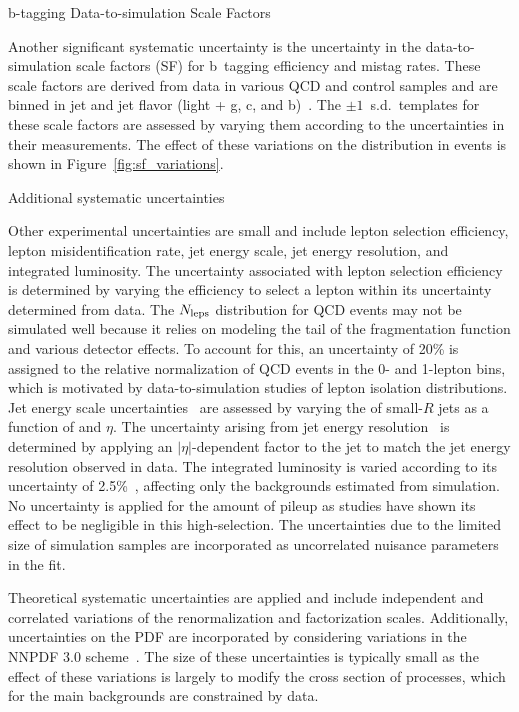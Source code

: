 \begin{section}{b-tagging Data-to-simulation Scale Factors}

Another significant systematic uncertainty is the uncertainty in the data-to-simulation scale factors (SF) for b~tagging efficiency and mistag rates.
These scale factors are derived from data in various QCD and \ttbar control samples and are binned in jet \pT and jet flavor (light + g, c, and b)~\cite{CMS-DP-2017-012}.
The $\pm 1$~s.d.\ \Nb templates for these scale factors are assessed by varying them according to the uncertainties in their measurements.
The effect of these variations on the \Nb distribution in \ttbar events is shown in Figure~\ref{fig:sf_variations}.

\end{section}

\begin{section}{Additional systematic uncertainties}

Other experimental uncertainties are small and include lepton selection efficiency, lepton misidentification rate, jet energy scale, jet energy resolution, and integrated luminosity.
The uncertainty associated with lepton selection efficiency is determined by varying the efficiency to select a lepton within its uncertainty determined from data.
The $N_{\mathrm{leps}}$ distribution for QCD events may not be simulated well because it relies on modeling the tail of the fragmentation function and various detector effects.
To account for this, an uncertainty of 20\% is assigned to the relative normalization of QCD events in the 0- and 1-lepton bins, which is motivated by data-to-simulation studies of lepton isolation distributions.
Jet energy scale uncertainties~\cite{Chatrchyan:2011ds,1748-0221-12-02-P02014} are assessed by varying the \pT of small-$R$ jets as a function of \pT and $\eta$.
The uncertainty arising from jet energy resolution~\cite{Chatrchyan:2011ds,1748-0221-12-02-P02014} is determined by applying an $|\eta|$-dependent factor to the jet \pT to match the jet energy resolution observed in data.
The integrated luminosity is varied according to its uncertainty of 2.5\%~\cite{CMS-PAS-LUM-17-001}, affecting only the backgrounds estimated from simulation.
No uncertainty is applied for the amount of pileup as studies have shown its effect to be negligible in this high-\HT selection.
The uncertainties due to the limited size of simulation samples are incorporated as uncorrelated nuisance parameters in the fit.

Theoretical systematic uncertainties are applied and include independent and correlated variations of the renormalization  and factorization scales.
Additionally, uncertainties on the PDF are incorporated by considering variations in the NNPDF 3.0 scheme~\cite{Ball:2014uwa}.
The size of these uncertainties is typically small as the effect of these variations is largely to modify the cross section of processes, which for the main backgrounds are constrained by data.


\end{section}
